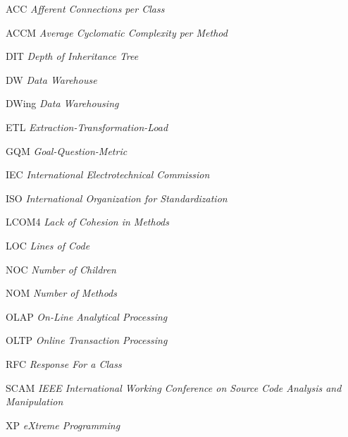 \begin{siglas}

\item [ACC]   \textit{Afferent Connections per Class}
\item [ACCM]  \textit{Average Cyclomatic Complexity per Method}
\item [DIT]	  \textit{Depth of Inheritance Tree}
\item [DW]	  \textit{Data Warehouse}
\item [DWing] \textit{Data Warehousing}
\item [ETL]   \textit{Extraction-Transformation-Load}
\item [GQM]   \textit{Goal-Question-Metric}
\item [IEC]   \textit{International Electrotechnical Commission}
\item [ISO]   \textit{International Organization for Standardization}
\item [LCOM4] \textit{Lack of Cohesion in Methods}
\item [LOC]   \textit{Lines of Code}
\item [NOC]   \textit{Number of Children}
\item [NOM]   \textit{Number of Methods}
\item [OLAP]  \textit{On-Line Analytical Processing}
\item [OLTP]  \textit{Online Transaction Processing}
\item [RFC]   \textit{Response For a Class}
\item [SCAM]  \textit{IEEE International Working Conference on Source Code Analysis and Manipulation}
\item [XP]    \textit{eXtreme Programming}
  
\end{siglas}
